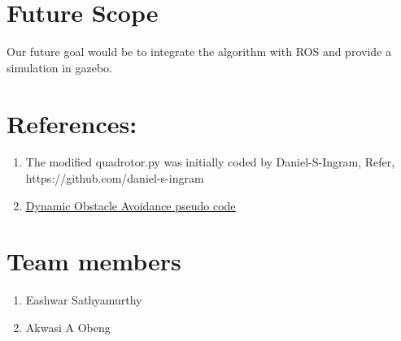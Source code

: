 \documentclass{IEEEtran}
\begin{document}
\section{\textbf{Future Scope}}
Our future goal would be to integrate the algorithm with ROS and provide a simulation in gazebo. 
\section{References:}
\begin{enumerate}
\item The modified quadrotor.py was initially coded by Daniel-S-Ingram, Refer,
https://github.com/daniel-s-ingram
\item \href{https://arxiv.org/pdf/1704.04585.pdf}{\underline{Dynamic Obstacle Avoidance pseudo code}}
\end{enumerate}

\section{Team members}
\begin{enumerate}
\item Eashwar Sathyamurthy
\item Akwasi A Obeng
\end{enumerate}
\end{document}
